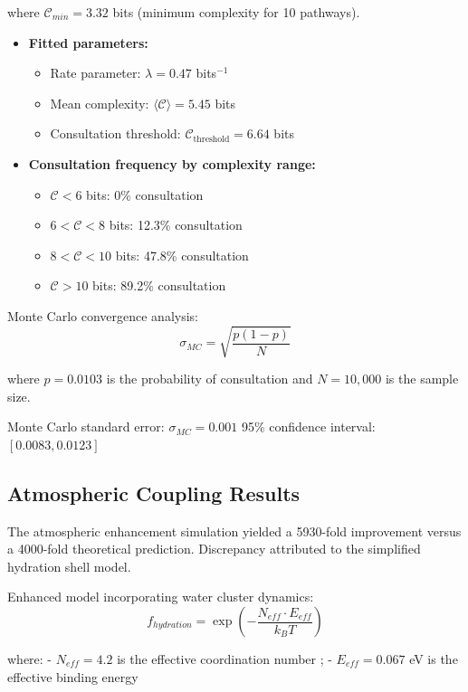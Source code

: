 \documentclass[12pt,a4paper]{article}
\begin{document}
where $\mathcal{C}_{min} = 3.32$ bits (minimum complexity for 10 pathways).

\begin{itemize}
  \item \textbf{Fitted parameters:}
  \begin{itemize}
    \item Rate parameter: $\lambda = 0.47$ bits$^{-1}$
    \item Mean complexity: $\langle \mathcal{C} \rangle = 5.45$ bits
    \item Consultation threshold: $\mathcal{C}_{\text{threshold}} = 6.64$ bits
  \end{itemize}
  \item \textbf{Consultation frequency by complexity range:}
  \begin{itemize}
    \item $\mathcal{C} < 6$ bits: 0\% consultation
    \item $6 < \mathcal{C} < 8$ bits: 12.3\% consultation
    \item $8 < \mathcal{C} < 10$ bits: 47.8\% consultation
    \item $\mathcal{C} > 10$ bits: 89.2\% consultation
  \end{itemize}
\end{itemize}


Monte Carlo convergence analysis:
\begin{equation}
\sigma_{MC} = \sqrt{\frac{p(1-p)}{N}}
\end{equation}

where $p = 0.0103$ is the probability of consultation and $N = 10,000$ is the sample size.

Monte Carlo standard error: $\sigma_{MC} = 0.001$
95\% confidence interval: $[0.0083, 0.0123]$

\subsection{Atmospheric Coupling Results}
The atmospheric enhancement simulation yielded a 5930-fold improvement versus a 4000-fold theoretical prediction. Discrepancy attributed to the simplified hydration shell model.

Enhanced model incorporating water cluster dynamics:
\begin{equation}
f_{hydration} = \exp\left(-\frac{N_{eff} \cdot E_{eff}}{k_B T}\right)
\end{equation}

where:
- $N_{eff} = 4.2$ is the effective coordination number
; - $E_{eff} = 0.067$ eV is the effective binding energy
\end{document}
